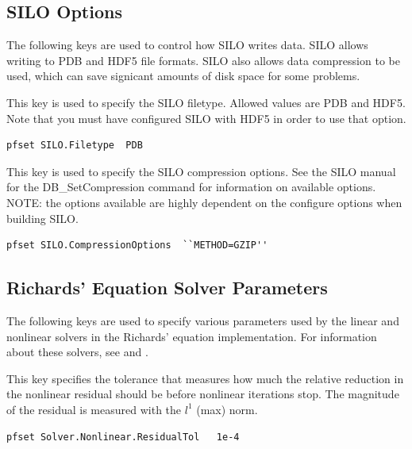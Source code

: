
\subsection{SILO Options}
\label{SILO Options}

The following keys are used to control how SILO writes data.  SILO
 allows writing to PDB and HDF5 file formats.  SILO also allows data
 compression to be used, which can save signicant amounts of disk
 space for some problems.

{
This key is used to specify the SILO filetype.   Allowed values are PDB and HDF5.  Note that you must have configured SILO with HDF5 in order to use that option.}
\begin{display}\begin{verbatim}
pfset SILO.Filetype  PDB
\end{verbatim}\end{display}


{
This key is used to specify the SILO compression options. See the SILO manual for the
 DB\_SetCompression command for information on available options.   NOTE: the options available are highly dependent on the configure options when building SILO.}
\begin{display}\begin{verbatim}
pfset SILO.CompressionOptions  ``METHOD=GZIP''
\end{verbatim}\end{display}



\subsection{Richards' Equation Solver Parameters}
\label{RE Solver Parameters}

The following keys are used to specify various parameters used by the linear
and nonlinear solvers in the Richards' equation implementation.
For information about these solvers, see
\cite{Woodward98} and \cite{Ashby-Falgout90}.

{This key specifies the tolerance that measures how much the relative
reduction in the nonlinear residual should be before nonlinear
iterations stop.  The magnitude of the residual is measured with
the $l^1$ (max) norm.
}
\begin{display}\begin{verbatim}
pfset Solver.Nonlinear.ResidualTol   1e-4
\end{verbatim}\end{display}

